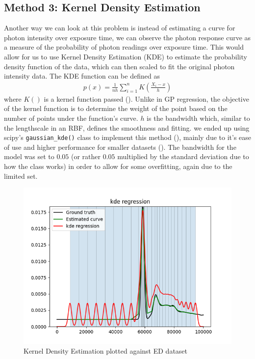 \documentclass[letterpaper,12pt]{article}
\begin{document}
\subsection{Method 3: Kernel Density Estimation}
Another way we can look at this problem is instead of estimating a curve for photon intensity
over exposure time, we can observe the photon response curve as a measure of the probability of 
photon readings over exposure time. This would allow for us to use Kernel Density Estimation (KDE)
to estimate the probability density function of the data, which can then scaled to fit the 
original photon intensity data. The KDE function can be defined as 
\begin{align*}
    p(x)=\frac{1}{nh}\sum_{i=1}^{n}K(\frac{X_{i}-x}{h})
\end{align*}
where $K()$ is a kernel function passed (\cite{chen2018lecture}). Unlike in GP regression, the 
objective of the kernel function is to determine the weight of the point based on the number 
of points under the function's curve. $h$ is the bandwidth which, similar to the lengthscale 
in an RBF, defines the smoothness and fitting. we ended up using scipy's \verb|gaussian_kde()| 
class to implement this method (\cite{virtanen2020scipy}), mainly due to it's ease of use 
and higher performance for smaller datasets (\cite{VanderPlas_2023}). The bandwidth for the
model was set to $0.05$ (or rather $0.05$ multiplied by the standard deviation due to how
the class works) in order to allow for some overfitting, again due to the limited set.
\begin{figure}[H]
\centering
\includegraphics[width=\linewidth]{kde_edh_graph}
\caption{Kernel Density Estimation plotted against ED dataset}
\end{figure}
\end{document}
